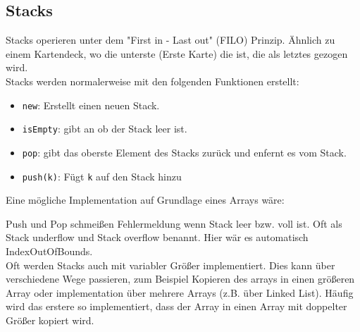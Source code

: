 \documentclass[ngerman,
color=3b,
load_common, %
boxarc,
main,
tikz,
border=3mm
]{article}
\begin{document}
\subsection{Stacks}
Stacks operieren unter dem "First in - Last out" (FILO) Prinzip. Ähnlich zu einem Kartendeck, wo die unterste (Erste Karte) die ist, die als letztes gezogen wird. \\
Stacks werden normalerweise mit den folgenden Funktionen erstellt:
\begin{itemize}
    \item \texttt{new}: Erstellt einen neuen Stack.
    \item \texttt{isEmpty}: gibt an ob der Stack leer ist.
    \item \texttt{pop}: gibt das oberste Element des Stacks zurück und enfernt es vom Stack.
    \item \texttt{push(k)}: Fügt \texttt{k} auf den Stack hinzu
\end{itemize}
Eine mögliche Implementation auf Grundlage eines Arrays wäre:
\begin{algorithm}
    \DontPrintSemicolon

\end{algorithm}
Push und Pop schmeißen Fehlermeldung wenn Stack leer bzw. voll ist. Oft als Stack underflow und Stack overflow benannt. Hier wär es automatisch IndexOutOfBounds.\\ Oft werden Stacks auch mit variabler Größer implementiert. Dies kann über verschiedene Wege passieren, zum Beispiel Kopieren des arrays in einen größeren Array oder implementation über mehrere Arrays (z.B. über Linked List). Häufig wird das erstere so implementiert, dass der Array in einen Array mit doppelter Größer kopiert wird.

\newpage
\end{document}
